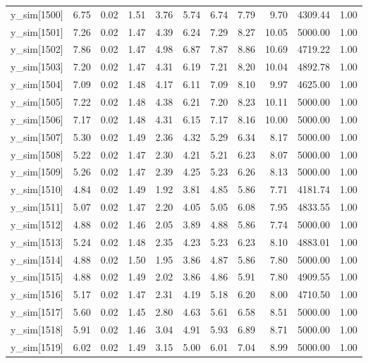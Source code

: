 \begin{table}[ht]
\begin{tabular}{rrrrrrrrrrr}
  y\_sim[1500] & 6.75 & 0.02 & 1.51 & 3.76 & 5.74 & 6.74 & 7.79 & 9.70 & 4309.44 & 1.00 \\ 
  y\_sim[1501] & 7.26 & 0.02 & 1.47 & 4.39 & 6.24 & 7.29 & 8.27 & 10.05 & 5000.00 & 1.00 \\ 
  y\_sim[1502] & 7.86 & 0.02 & 1.47 & 4.98 & 6.87 & 7.87 & 8.86 & 10.69 & 4719.22 & 1.00 \\ 
  y\_sim[1503] & 7.20 & 0.02 & 1.47 & 4.31 & 6.19 & 7.21 & 8.20 & 10.04 & 4892.78 & 1.00 \\ 
  y\_sim[1504] & 7.09 & 0.02 & 1.48 & 4.17 & 6.11 & 7.09 & 8.10 & 9.97 & 4625.00 & 1.00 \\ 
  y\_sim[1505] & 7.22 & 0.02 & 1.48 & 4.38 & 6.21 & 7.20 & 8.23 & 10.11 & 5000.00 & 1.00 \\ 
  y\_sim[1506] & 7.17 & 0.02 & 1.48 & 4.31 & 6.15 & 7.17 & 8.16 & 10.00 & 5000.00 & 1.00 \\ 
  y\_sim[1507] & 5.30 & 0.02 & 1.49 & 2.36 & 4.32 & 5.29 & 6.34 & 8.17 & 5000.00 & 1.00 \\ 
  y\_sim[1508] & 5.22 & 0.02 & 1.47 & 2.30 & 4.21 & 5.21 & 6.23 & 8.07 & 5000.00 & 1.00 \\ 
  y\_sim[1509] & 5.26 & 0.02 & 1.47 & 2.39 & 4.25 & 5.23 & 6.26 & 8.13 & 5000.00 & 1.00 \\ 
  y\_sim[1510] & 4.84 & 0.02 & 1.49 & 1.92 & 3.81 & 4.85 & 5.86 & 7.71 & 4181.74 & 1.00 \\ 
  y\_sim[1511] & 5.07 & 0.02 & 1.47 & 2.20 & 4.05 & 5.05 & 6.08 & 7.95 & 4833.55 & 1.00 \\ 
  y\_sim[1512] & 4.88 & 0.02 & 1.46 & 2.05 & 3.89 & 4.88 & 5.86 & 7.74 & 5000.00 & 1.00 \\ 
  y\_sim[1513] & 5.24 & 0.02 & 1.48 & 2.35 & 4.23 & 5.23 & 6.23 & 8.10 & 4883.01 & 1.00 \\ 
  y\_sim[1514] & 4.88 & 0.02 & 1.50 & 1.95 & 3.86 & 4.87 & 5.86 & 7.80 & 5000.00 & 1.00 \\ 
  y\_sim[1515] & 4.88 & 0.02 & 1.49 & 2.02 & 3.86 & 4.86 & 5.91 & 7.80 & 4909.55 & 1.00 \\ 
  y\_sim[1516] & 5.17 & 0.02 & 1.47 & 2.31 & 4.19 & 5.18 & 6.20 & 8.00 & 4710.50 & 1.00 \\ 
  y\_sim[1517] & 5.60 & 0.02 & 1.45 & 2.80 & 4.63 & 5.61 & 6.58 & 8.51 & 5000.00 & 1.00 \\ 
  y\_sim[1518] & 5.91 & 0.02 & 1.46 & 3.04 & 4.91 & 5.93 & 6.89 & 8.71 & 5000.00 & 1.00 \\ 
  y\_sim[1519] & 6.02 & 0.02 & 1.49 & 3.15 & 5.00 & 6.01 & 7.04 & 8.99 & 5000.00 & 1.00 \\ 

\end{tabular}
\end{table}
